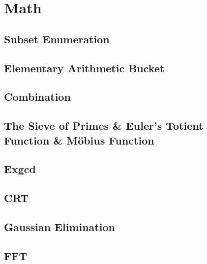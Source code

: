 \documentclass[a4paper]{article}
\begin{document}
\section{Math}

\subsection{Subset Enumeration}



\subsection{Elementary Arithmetic Bucket}



\subsection{Combination}



\subsection{The Sieve of Primes \& Euler's Totient Function \& Möbius Function}



\subsection{Exgcd}



\subsection{CRT}



\subsection{Gaussian Elimination}



\subsection{FFT}


\end{document}
